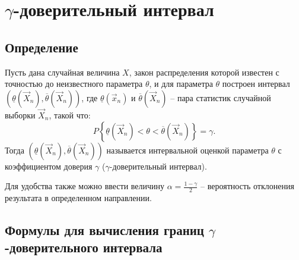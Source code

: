 \chapter{$\gamma$-доверительный интервал}

\section{Определение}

Пусть дана случайная величина $X$, закон распределения которой известен с точностью до неизвестного параметра $\theta$, и для параметра $\theta$ построен интервал $(\underline \theta (\vec X_n), \overline \theta (\vec X_n))$, где $\underline \theta (\vec x_n)$ и $\overline \theta (\vec X_n)$ -- пара статистик случайной выборки $\vec X_n$, такой что:
\begin{equation}
P\left\{\underline \theta (\vec X_n) < \theta < \overline \theta (\vec X_n)\right\} = \gamma.
\end{equation}
Тогда $(\underline \theta (\vec X_n), \overline \theta (\vec X_n))$ называется интервальной оценкой параметра $\theta$ с коэффициентом доверия $\gamma$ ($\gamma$-доверительный интервал).

Для удобства также можно ввести величину $\alpha = \displaystyle \frac{1 - \gamma}{2}$ -- вероятность отклонения результата в определенном направлении.

\section{Формулы для вычисления границ $\gamma$-доверительного интервала}

